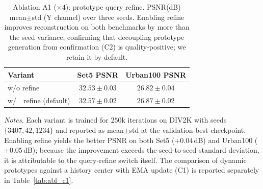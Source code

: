 \begin{table}[H]
\centering
\caption{Ablation A1 ($\times 4$): prototype query refine. PSNR(dB) mean$\pm$std (Y channel)
over three seeds. Enabling refine improves reconstruction on both benchmarks by
more than the seed variance, confirming that decoupling prototype generation from confirmation
(C2) is quality-positive; we retain it by default.}
\label{tab:abl_a1}
\begingroup
\scriptsize
\setlength{\tabcolsep}{3pt}
\renewcommand{\arraystretch}{1.05}
\begin{tabular*}{\columnwidth}{@{\extracolsep{\fill}}lcc}
\toprule
Variant & Set5 PSNR & Urban100 PSNR \\
\midrule
w/o refine               & $32.53\pm0.03$ & $26.82\pm0.04$ \\
w/\ \ refine (default)   & $\mathbf{32.57\pm0.02}$ & $\mathbf{26.87\pm0.02}$ \\
\bottomrule
\end{tabular*}
\endgroup

\vspace{2pt}
{\footnotesize
\textit{Notes.} Each variant is trained for $250$k iterations on DIV2K with seeds
$\{3407,42,1234\}$ and reported as mean$\pm$std at the validation-best checkpoint. Enabling
refine yields the better PSNR on both Set5 ($+0.04$\,dB) and Urban100 ($+0.05$\,dB); because the
improvement exceeds the seed-to-seed standard deviation, it is attributable to the query-refine
switch itself. The comparison of dynamic prototypes against a history center with EMA update
(C1) is reported separately in Table~\ref{tab:abl_c1}.}
\end{table}

